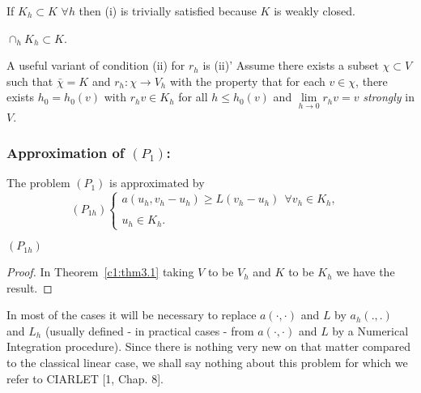 \begin{remark}\label{c1:rem5.1}%
If $K_h \subset K$ $\forall h$ then (i) is trivially satisfied because
$K$ is weakly closed. 
\end{remark}

\begin{remark}\label{c1:rem5.2}%
$\displaystyle{\mathop{\cap}_h} K_h \subset K$.
\end{remark}

\begin{remark}\label{c1:rem5.3}%
A useful variant of condition (ii) for $r_h$ is (ii)' Assume there
exists a subset $\chi \subset V$ such that $\bar{\chi} = K$ and $r_h :
\chi \to V_h$ with the property that for each $v \in \chi$, there
exists $h_0 = h_0 (v)$ with $r_h v \in K_h$ for all $h \leq h_0
(v)$ and $\lim \limits_{h \to 0} r_h v = v$ {\em strongly} in $V$. 
\end{remark}

\subsubsection{Approximation of $(P_1)$:}\label{c1:sss5.3.2}%

 The problem $(P_1)$ is approximated by 
\begin{equation*}
(P_{1h})
\begin{cases}
a(u_h, v_h - u_h) \geq L(v_h - u_h) ~~\forall v_h \in K_h,\\
&\\
u_h \in K_h.
\end{cases}
\end{equation*}

\begin{theorem}\label{c1:thm5.1}%
$(P_{1h})$
\end{theorem}

\begin{proof}
In Theorem~\ref{c1:thm3.1} taking $V$ to be $V_h$ and $K$ to be $K_h$
we have the result. 
\end{proof}

\begin{remark}\label{c1:rem5.4}%
In most of the cases it will be necessary to replace $a(\cdot , \cdot)$ and
$L$ by $a_h( . , .)$ and $L_h$ (usually defined - in practical cases -
from $a(\cdot , \cdot)$ and $L$ by a Numerical Integration procedure). Since
there is nothing very new on that matter compared to the classical
linear case, we shall say nothing about this problem for which we
refer to CIARLET [1, Chap. 8]. 
\end{remark}

